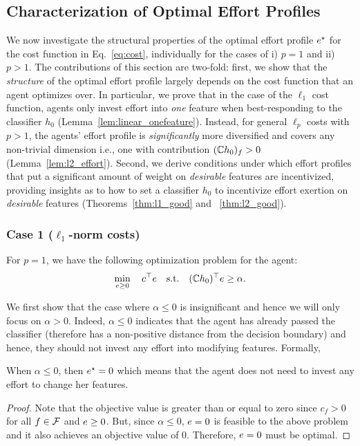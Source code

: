\subsection{Characterization of Optimal Effort Profiles}

We now investigate the structural properties of the optimal effort profile $e^{\star}$ for the cost function in Eq.~\eqref{eq:cost}, individually for the cases of i) $p = 1$ and ii) $p > 1$. 
The contributions of this section are two-fold: first, we show that the \emph{structure} of the optimal effort profile largely depends on the cost function that an agent optimizes over. In particular, we prove that in the case of the $\ell_1$ cost function, agents only invest effort into \emph{one} feature when best-responding to the classifier $h_0$ (Lemma~\ref{lem:linear_onefeature}). Instead, for general $\ell_p$ costs with $p > 1$, the agents' effort profile is \emph{significantly} more diversified and covers any non-trivial dimension i.e., one with contribution $(\mathbb{C} h_0)_f > 0$ (Lemma~\ref{lem:l2_effort}). Second, we derive conditions under which effort profiles that put a significant amount of weight on \emph{desirable} features are incentivized, providing insights as to how to set a classifier $h_0$ to incentivize effort exertion on \emph{desirable} features (Theorems~\ref{thm:l1_good} and ~\ref{thm:l2_good}). 


\subsubsection{Case 1 ($\ell_1$-norm costs)} 
For $p=1$, we have the following optimization problem for the agent: 
\begin{align}\label{opt:linear}
     \min_{e \geq 0} \quad c^{\top}e \quad \text{s.t.} \quad 
     (\mathbb{C} h_0)^{\top}e \geq \alpha. 
\end{align}

We first show that the case where $\alpha \leq 0$ is insignificant and hence we will only focus on $\alpha > 0$. Indeed, $\alpha \leq 0$ indicates that the agent has already passed the classifier (therefore has a non-positive distance from the decision boundary) and hence, they should not invest any effort into modifying features. Formally, 
\begin{prop}\label{prop:alpha_neg}
When $\alpha \leq 0$, then $e^{\star} = 0$ which means that the agent does not need to invest any effort to change her features. 
\end{prop}
\begin{proof}
Note that the objective value is greater than or equal to zero since $c_f > 0$ for all $f \in \mathcal{F}$ and $e \geq 0$. But, since $\alpha \leq 0$, $e= 0$ is feasible to the above problem and it also achieves an objective value of $0$. Therefore, $e = 0$ must be optimal.  
\end{proof}

